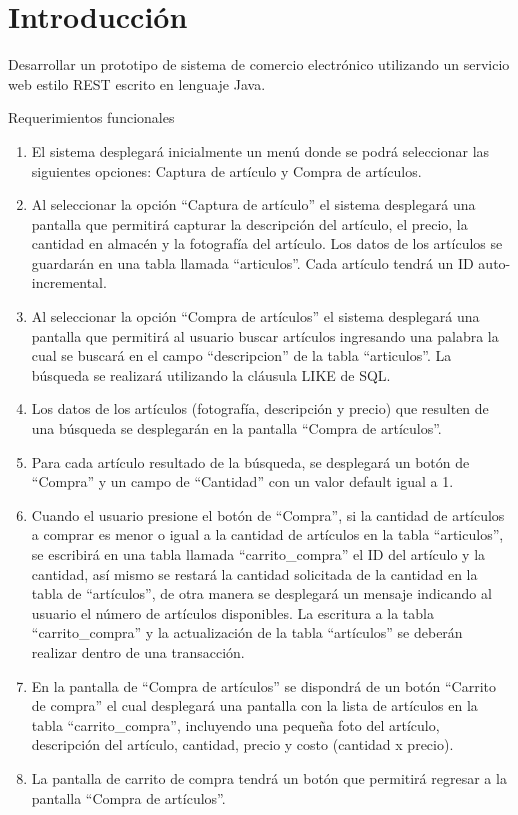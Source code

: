 \documentclass[11pt]{article}
\begin{document}
	\section{Introducción}
	Desarrollar un prototipo de sistema de comercio electrónico utilizando un servicio web estilo REST escrito en lenguaje Java.\par
	Requerimientos funcionales
		\begin{enumerate}
			\item El sistema desplegará inicialmente un menú donde se podrá seleccionar las siguientes opciones: Captura de artículo y Compra de artículos.
			\item Al seleccionar la opción ``Captura de artículo'' el sistema desplegará una pantalla que permitirá capturar la descripción del artículo, el precio, la cantidad en almacén y la fotografía del artículo. Los datos de los artículos se guardarán en una tabla llamada ``articulos''. Cada artículo tendrá un ID auto-incremental.
			\item Al seleccionar la opción ``Compra de artículos'' el sistema desplegará una pantalla que permitirá al usuario buscar artículos ingresando una palabra la cual se buscará en el campo ``descripcion'' de la tabla ``articulos''. La búsqueda se realizará utilizando la cláusula LIKE de SQL.
			\item Los datos de los artículos (fotografía, descripción y precio) que resulten de una búsqueda se desplegarán en la pantalla ``Compra de artículos''.
			\item Para cada artículo resultado de la búsqueda, se desplegará un botón de ``Compra'' y un campo de ``Cantidad'' con un valor default igual a 1.
			\item Cuando el usuario presione el botón de ``Compra'', si la cantidad de artículos a comprar es menor o igual a la cantidad de artículos en la tabla ``articulos'', se escribirá en una tabla llamada ``carrito\_compra'' el ID del artículo y la cantidad, así mismo se restará la cantidad solicitada de la cantidad en la tabla de ``artículos'', de otra manera se desplegará un mensaje indicando al usuario el número de artículos disponibles. La escritura a la tabla ``carrito\_compra'' y la actualización de la tabla ``artículos'' se deberán realizar dentro de una transacción.
			\item En la pantalla de ``Compra de artículos'' se dispondrá de un botón ``Carrito de compra'' el cual desplegará una pantalla con la lista de artículos en la tabla ``carrito\_compra'', incluyendo una pequeña foto del artículo, descripción del artículo, cantidad, precio y costo (cantidad x precio).
			\item La pantalla de carrito de compra tendrá un botón que permitirá regresar a la pantalla ``Compra de artículos''.
		\end{enumerate}
\end{document}
